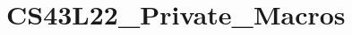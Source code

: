 \hypertarget{group___c_s43_l22___private___macros}{}\section{C\+S43\+L22\+\_\+\+Private\+\_\+\+Macros}
\label{group___c_s43_l22___private___macros}
